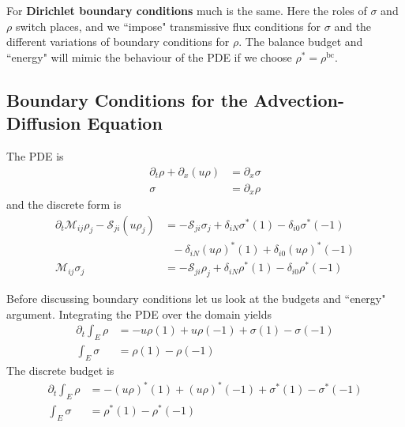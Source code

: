 \documentclass{report}
\numberwithin{equation}{section}
\begin{document}
For \textbf{Dirichlet boundary conditions} much is the same. Here the roles of $\sigma$ and $\rho$ switch places, and we ``impose" transmissive flux conditions for $\sigma$ and the different variations of boundary conditions for $\rho$. The balance budget and ``energy" will mimic the behaviour of the PDE if we choose $\rho^* = \rho^\text{bc}$.

\subsection{Boundary Conditions for the Advection-Diffusion Equation}
\label{advection_diffusion_equations_bc}
The PDE is 
\begin{align}
    \partial_t \rho + \partial_x (u \rho) &= \partial_x \sigma \\
    \sigma &= \partial_x \rho
\end{align}
and the discrete form is 
\begin{align}
    \label{discrete_form_1}
    \partial_t \mathcal{M}_{ij} \rho_j - \mathcal{S}_{ji} (u \rho_j) &= 
    - \mathcal{S}_{ji} \sigma_j
    + \delta_{iN} \sigma^*(1) 
    - \delta_{i0} \sigma^*(-1)
    \\
    \nonumber
    &\text{ } - \delta_{iN} (u \rho)^*(1) 
    +  
    \delta_{i0} (u \rho)^*(-1)
    \\
    \label{discrete_form_2}
    \mathcal{M}_{ij} \sigma_j &= -  \mathcal{S}_{ji}\rho_j
    + \delta_{iN} \rho^*(1) 
    -
    \delta_{i0} \rho^*(-1)
\end{align}

Before discussing boundary conditions let us look at the budgets and ``energy" argument. Integrating the PDE over the domain yields 
\begin{align}
\label{advection_diffusion_budget_pde}
    \partial_t \int_E \rho 
    &= -u \rho(1) + u \rho(-1) +  \sigma(1) - \sigma(-1)
    \\
    \int_E \sigma &= \rho(1) - \rho(-1)
\end{align}
The discrete budget is 
\begin{align}
\label{advection_diffusion_budget_discrete}
    \partial_t \int_E \rho 
    &= -(u \rho)^*(1) + (u \rho)^*(-1) +  \sigma^*(1) - \sigma^*(-1)
    \\
    \int_E \sigma &= \rho^*(1) - \rho^*(-1)
\end{align}
\end{document}
